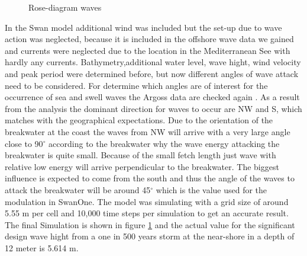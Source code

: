 \begin{figure}[H]
\center
{}
\caption{Rose-diagram waves}
\label{Hsig_Depth_Plot}
\end{figure}
In the Swan model additional wind was  included but the set-up due to wave action was neglected, because it is included in the offshore wave data we gained and currents were neglected due to the location in the Mediterranean See with hardly any currents.
Bathymetry,additional water level, wave hight, wind velocity and peak period were determined before, but now different angles of wave attack need to be considered.
For determine which angles are of interest for the occurrence of sea and swell waves the Argoss data are checked again 
. As a result from the analysis the dominant direction for waves to occur are NW and S, which matches with the geographical expectations. Due to the orientation of the breakwater at the coast the waves from NW will arrive with a very large angle close to 90$^\circ$ according to the breakwater why the wave energy attacking the breakwater is quite small. Because of the small fetch length just wave with relative low energy will arrive perpendicular to the breakwater. The biggest influence is expected to come from the south and thus the angle of the waves to attack the breakwater will be around 45$^\circ$ which is the value used for the modulation in SwanOne. 
The model was simulating with a grid size of around 5.55 m per cell and 10,000 time steps per simulation to get an accurate result.
The final Simulation is shown in figure \ref{Hsig_Depth_Plot} and the actual value for the significant design wave hight from a one in 500 years storm at the near-shore in a depth of 12 meter is 5.614 m.